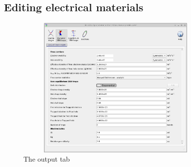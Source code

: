 \subsection{Editing electrical materials}

\begin{figure}[H]
\centering
\includegraphics[width=100mm,height=70mm]{./images/dos_editor.png}
\caption{The output tab}
\label{fig:jv_curve}
\end{figure}
